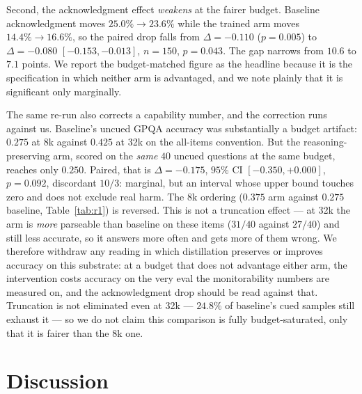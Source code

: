 \documentclass{article}
\begin{document}
Second, the acknowledgment effect \emph{weakens} at the fairer budget. Baseline
acknowledgment moves $25.0\% \to 23.6\%$ while the trained arm moves
$14.4\% \to 16.6\%$, so the paired drop falls from $\Delta = -0.110$
($p = 0.005$) to $\Delta = -0.080$ $[-0.153, -0.013]$, $n = 150$,
$p = 0.043$. The gap narrows from $10.6$ to $7.1$ points. We report the
budget-matched figure as the headline because it is the specification in which
neither arm is advantaged, and we note plainly that it is significant only
marginally.

The same re-run also corrects a capability number, and the correction runs
against us. Baseline's uncued GPQA accuracy was substantially a budget
artifact: $0.275$ at 8k against $0.425$ at 32k on the all-items convention.
But the reasoning-preserving arm, scored on the \emph{same} $40$ uncued
questions at the same budget, reaches only $0.250$. Paired, that is
$\Delta = -0.175$, $95\%$ CI $[-0.350, +0.000]$, $p = 0.092$, discordant
$10/3$: marginal, but an interval whose upper bound touches zero and does not
exclude real harm. The 8k ordering ($0.375$ arm against $0.275$ baseline,
Table~\ref{tab:r1}) is reversed. This is not a truncation effect --- at 32k the
arm is \emph{more} parseable than baseline on these items ($31/40$ against
$27/40$) and still less accurate, so it answers more often and gets more of
them wrong. We therefore withdraw any reading in which distillation preserves
or improves accuracy on this substrate: at a budget that does not advantage
either arm, the intervention costs accuracy on the very eval the monitorability
numbers are measured on, and the acknowledgment drop should be read against
that.
Truncation is not eliminated even at 32k --- $24.8\%$ of baseline's cued
samples still exhaust it --- so we do not claim this comparison is fully
budget-saturated, only that it is fairer than the 8k one.

\section{Discussion}
\end{document}
